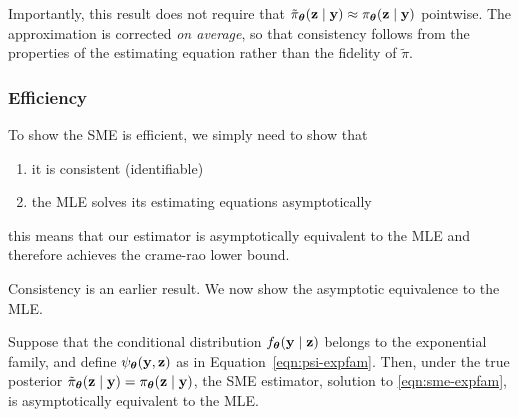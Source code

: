 \documentclass[twoside,11pt]{article}
\begin{document}
\noindent
Importantly, this result does not require that \( \tilde{\pi}_{\bm{\theta}}({\bf z} \mid {\bf y}) \approx \pi_{\bm{\theta}}({\bf z} \mid {\bf y}) \) pointwise. The approximation is corrected \emph{on average}, so that consistency follows from the properties of the estimating equation rather than the fidelity of \( \tilde{\pi} \).

\subsubsection{Efficiency}
To show the SME is efficient, we simply need to show that
\begin{enumerate}
\item it is consistent (identifiable)
\item the MLE solves its estimating equations asymptotically
\end{enumerate}
this means that our estimator is asymptotically equivalent to the MLE and therefore achieves the crame-rao lower bound.

Consistency is an earlier result. We now show the asymptotic equivalence to the MLE.
\begin{lemma}
\label{lemma:equivalence-true-posterior}
Suppose that the conditional distribution \( f_{\bm{\theta}}({\bf y} \mid {\bf z}) \) belongs to the exponential family, and define \( \psi_{\bm{\theta}}({\bf y}, {\bf z}) \) as in Equation~\eqref{eqn:psi-expfam}. Then, under the true posterior \( \tilde \pi_{\bm{\theta}}({\bf z} \mid {\bf y}) = \pi_{\bm{\theta}}({\bf z} \mid {\bf y}) \), the SME estimator, solution to \eqref{eqn:sme-expfam}, is asymptotically equivalent to the MLE.
\end{lemma}
\end{document}
